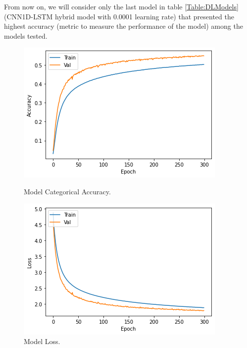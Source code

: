 From now on, we will consider only the last model in table \ref{Table:DLModels} (CNN1D-LSTM hybrid model with 0.0001 learning rate) that presented the highest accuracy (metric to measure the performance of the model) among the models tested. 

\begin{figure}[!tbp]
  \centering
  \begin{minipage}[b]{0.45\textwidth}
    \includegraphics[width=\textwidth]{../Figures/accuracy_model}
    \caption{Model Categorical Accuracy.}
    \label{Fig:Model_Cat_Acc}
  \end{minipage}
  \hfill
  \begin{minipage}[b]{0.45\textwidth}
    \includegraphics[width=\textwidth]{../Figures/loss_model}
    \caption{Model Loss.}
    \label{Fig:Model_Loss}
  \end{minipage}
\end{figure}

